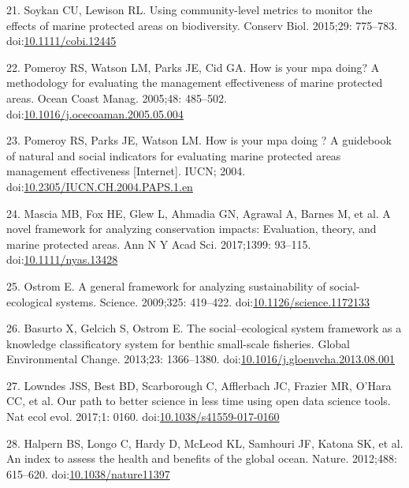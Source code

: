 \documentclass[12pt,]{article}
\begin{document}
\hypertarget{ref-soykan_2015-nu}{}
21. Soykan CU, Lewison RL. Using community-level metrics to monitor the
effects of marine protected areas on biodiversity. Conserv Biol.
2015;29: 775--783.
doi:\href{https://doi.org/10.1111/cobi.12445}{10.1111/cobi.12445}

\hypertarget{ref-pomeroy_2005-Py}{}
22. Pomeroy RS, Watson LM, Parks JE, Cid GA. How is your mpa doing? A
methodology for evaluating the management effectiveness of marine
protected areas. Ocean Coast Manag. 2005;48: 485--502.
doi:\href{https://doi.org/10.1016/j.ocecoaman.2005.05.004}{10.1016/j.ocecoaman.2005.05.004}

\hypertarget{ref-pomeroy_2004-23}{}
23. Pomeroy RS, Parks JE, Watson LM. How is your mpa doing ? A guidebook
of natural and social indicators for evaluating marine protected areas
management effectiveness {[}Internet{]}. IUCN; 2004.
doi:\href{https://doi.org/10.2305/IUCN.CH.2004.PAPS.1.en}{10.2305/IUCN.CH.2004.PAPS.1.en}

\hypertarget{ref-mascia_2017-m_}{}
24. Mascia MB, Fox HE, Glew L, Ahmadia GN, Agrawal A, Barnes M, et al. A
novel framework for analyzing conservation impacts: Evaluation, theory,
and marine protected areas. Ann N Y Acad Sci. 2017;1399: 93--115.
doi:\href{https://doi.org/10.1111/nyas.13428}{10.1111/nyas.13428}

\hypertarget{ref-ostrom_2009-hg}{}
25. Ostrom E. A general framework for analyzing sustainability of
social-ecological systems. Science. 2009;325: 419--422.
doi:\href{https://doi.org/10.1126/science.1172133}{10.1126/science.1172133}

\hypertarget{ref-basurto_2013-oq}{}
26. Basurto X, Gelcich S, Ostrom E. The social--ecological system
framework as a knowledge classificatory system for benthic small-scale
fisheries. Global Environmental Change. 2013;23: 1366--1380.
doi:\href{https://doi.org/10.1016/j.gloenvcha.2013.08.001}{10.1016/j.gloenvcha.2013.08.001}

\hypertarget{ref-lowndes_2017-xh}{}
27. Lowndes JSS, Best BD, Scarborough C, Afflerbach JC, Frazier MR,
O'Hara CC, et al. Our path to better science in less time using open
data science tools. Nat ecol evol. 2017;1: 0160.
doi:\href{https://doi.org/10.1038/s41559-017-0160}{10.1038/s41559-017-0160}

\hypertarget{ref-halpern_2012-k9}{}
28. Halpern BS, Longo C, Hardy D, McLeod KL, Samhouri JF, Katona SK, et
al. An index to assess the health and benefits of the global ocean.
Nature. 2012;488: 615--620.
doi:\href{https://doi.org/10.1038/nature11397}{10.1038/nature11397}
\end{document}
